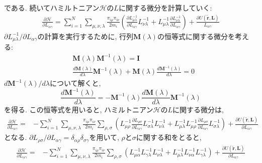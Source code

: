 である. 続いてハミルトニアン$\mathcal{H}$の$L$に関する微分を計算していく:
\begin{align}
  \frac{\partial \mathcal{H}}{\partial L_{\alpha\gamma}} =
  \sum_{i=1}^{N}
  \sum_{\mu,\nu,\lambda} \frac{\pi_{i\mu}\pi_{i\nu}}{2m_{i}}
  \left(
    \frac{\partial L_{\mu\lambda}^{-1}}{\partial L_{\alpha\gamma}} L_{\nu\lambda}^{-1} +
    L_{\mu\lambda}^{-1} \frac{\partial L_{\nu\lambda}^{-1}}{\partial L_{\alpha\gamma}}
  \right) +
  \frac{\partial U(\tilde{\bm{r}}, \bm{L})}{L_{\alpha\gamma}}
\end{align}
$\partial L_{\mu\lambda}^{-1}/\partial L_{\alpha\gamma}$の計算を実行するために, 行列$\bm{M}(\lambda)$の恒等式に関する微分を考える:
\begin{align}
  &\bm{M}(\lambda)\bm{M}^{-1}(\lambda) = \bm{I} \\
  &\frac{d\bm{M}(\lambda)}{d \lambda} \bm{M}^{-1}(\lambda) + \bm{M}(\lambda)\frac{d\bm{M}^{-1}(\lambda)}{d\lambda} = 0
\end{align}
$d\bm{M}^{-1}(\lambda)/d\lambda$について解くと, 
\begin{equation}
  \frac{d\bm{M}^{-1}(\lambda)}{d \lambda} = - \bm{M}^{-1}(\lambda)\frac{d\bm{M}(\lambda)}{d\lambda} \bm{M}^{-1}(\lambda)
\end{equation}
を得る. この恒等式を用いると, ハミルトニアン$\mathcal{H}$の$L$に関する微分は, 
\begin{align}
  \frac{\partial \mathcal{H}}{\partial L_{\alpha\gamma}} =&
  -\sum_{i=1}^{N}
  \sum_{\mu,\nu,\lambda} \frac{\pi_{i\mu}\pi_{i\nu}}{2m_{i}}
  \sum_{\rho,\sigma}
  \left(
    L_{\mu\rho}^{-1} \frac{\partial L_{\rho\sigma}}{\partial L_{\alpha\gamma}} L_{\sigma\lambda}^{-1} L_{\nu\lambda}^{-1} +
    L_{\mu\lambda}^{-1} L_{\mu\rho}^{-1} \frac{\partial L_{\rho\sigma}}{\partial L_{\alpha\gamma}} L_{\sigma\lambda}^{-1}
  \right) +
  \frac{\partial U(\tilde{\bm{r}}, \bm{L})}{\partial L_{\alpha\gamma}}
\end{align}
となる. $\partial L_{\rho\sigma}/\partial L_{\alpha\gamma} = \delta_{\alpha\rho}\delta_{\sigma\gamma}$を用いて, $\rho$と$\sigma$に関する和をとると,
\begin{align}
  \frac{\partial \mathcal{H}}{\partial L_{\alpha\gamma}} =&
  -\sum_{i=1}^{N}
  \sum_{\mu,\nu,\lambda} \frac{\pi_{i\mu}\pi_{i\nu}}{2m_{i}}
  \sum_{\rho,\sigma}
  \left(
    L_{\mu\alpha}^{-1} L_{\gamma\lambda}^{-1} L_{\nu\lambda}^{-1} +
    L_{\mu\lambda}^{-1} L_{\nu\alpha}^{-1} L_{\gamma\lambda}^{-1}
  \right) +
  \frac{\partial U(\tilde{\bm{r}}, \bm{L})}{\partial L_{\alpha\gamma}}
\end{align}
